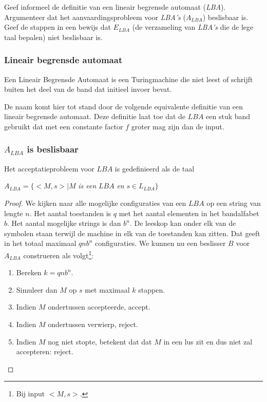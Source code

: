 \begin{question}
	Geef informeel de definitie van een lineair begrensde automaat (\emph{LBA}). Argumenteer dat het aanvaardingsprobleem voor \emph{LBA's} ($A_{LBA}$) beslisbaar is. Geef de stappen in een bewijs dat $E_{LBA}$ (de verzameling van \emph{LBA's} die de lege taal bepalen) niet beslisbaar is.
\end{question}

\subsubsection*{Lineair begrensde automaat}

\begin{theorem}
	Een Lineair Begrensde Automaat is een Turingmachine die niet leest of schrijft buiten het deel van de band dat initieel invoer bevat.
\end{theorem}

De naam komt hier tot stand door de volgende equivalente definitie van een lineair begrensde automaat. Deze definitie laat toe dat de $LBA$ een stuk band gebruikt dat met een constante factor $f$ groter mag zijn dan de input.

\subsubsection*{$A_{LBA}$ is beslisbaar}

Het acceptatieprobleem voor $LBA$ is gedefinieerd als de taal
\begin{center}
	$A_{LBA} = \{<M,s>|M$ \textit{is een} $LBA$ \textit{en} $s \in L_{LBA}\}$
\end{center}

\begin{proof}
	We kijken naar alle mogelijke configuraties van een $LBA$ op een string van lengte $n$. Het aantal toestanden is $q$ met het aantal elementen in het bandalfabet $b$. Het aantal mogelijke strings is dan $b^n$. De leeskop kan onder elk van de symbolen staan terwijl de machine in elk van de toestanden kan zitten. Dat geeft in het totaal maximaal $qnb^n$ configuraties.
	We kunnen nu een beslisser $B$ voor $A_{LBA}$ construeren als volgt\footnote{Bij input $<M,s>$.}:
	\begin{enumerate}
		\item Bereken $k=qnb^n$.
		\item Simuleer dan $M$ op $s$ met maximaal $k$ stappen.
		\item Indien $M$ ondertussen accepteerde, accept.
		\item Indien $M$ ondertussen verwierp, reject.
		\item Indien $M$ nog niet stopte, betekent dat dat $M$ in een lus zit en dus niet zal accepteren: reject.
	\end{enumerate}
\end{proof}

